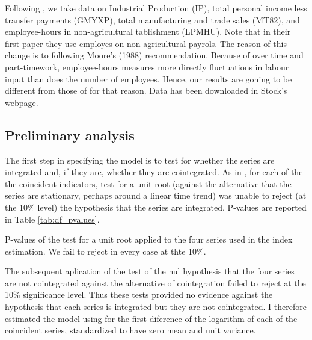 	Following , we take data on Industrial Production (IP), total personal income less transfer payments (GMYXP), total manufacturing and trade sales (MT82), and employee-hours in non-agricultural
	tablishment (LPMHU). Note that in their first paper \citeyear{stock1988probability} they use employes on non agricultural payrols.  The reason of this change is to following Moore's (1988) recommendation. Because of over time and part-timework, employee-hours measures more directly fluctuations in labour input than does the number of employees. Hence, our results are goning to be different from those of  for that reason. Data has been downloaded in Stock's \href{https://www.princeton.edu/~mwatson/publi.html}{webpage}.  %

	\subsection{Preliminary analysis}
	
	The first step in specifying the model is to test for whether the series are integrated and, if they are, whether they are cointegrated.  As in , for each of the the coincident indicators,  test for a unit root (against the alternative that the series are stationary, perhaps around a linear time trend) was unable to reject (at the 10\% level) the hypothesis that the series are integrated. P-values are reported in Table \ref{tab:df_pvalues}.
	
	\begin{table}[h!]
		\centering\small
		\captionsetup{width=0.6\textwidth, font=small}
		\caption{P-values of the test \protect{} for a unit root applied to the four series used in the index estimation. We fail to reject in every case at thte 10\%.}\label{tab:df_pvalues}
		\vspace{0cm}
		
	\end{table}
 
	The subsequent aplication of the  test of the nul hypothesis that the four series are not cointegrated against the alternative of cointegration failed to reject at the 10\% significance level. Thus these tests provided no evidence against the hypothesis that each series is integrated but they are not cointegrated. I therefore estimated the model using for the first diference of the logarithm of each of the coincident series, standardized to have zero mean and unit variance.

